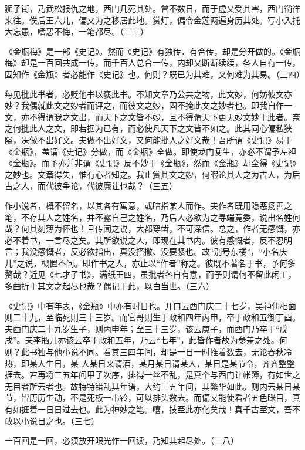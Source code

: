 {狮子街，乃武松报仇之地，西门几死其处。曾不数日，而于虚又受其害，西门徜徉来往。俟后王六儿，偏又为之移居此地。赏灯，偏令金莲两遍身历其处。写小入托大忘患，嗜恶不悔，一笔都尽。（三三）

《金瓶梅》是一部《史记》。然而《史记》有独传．有合传，却是分开做的。《金瓶梅》却是一百回共成一传，而千百人总合一传，内却又断断续续，各人自有一传，固知作《金瓶》者必能作《史记》也。何则？既已为其难，又何难为其易。（三四）

每见批此书者，必贬他书以褒此书。不知文章乃公共之物，此文妙，何妨彼文亦妙？我偶就此文之妙者而评之，而彼文之妙，固不掩此文之妙者也。即我自作一文，亦不得谓我之文出，而天下之文皆不妙，且不得谓天下更无妙文妙于此者。奈之何批此人之文，即若据为已有，而必使凡天下之文皆不如之。此其同心偏私狭隘，决做不出好文。夫做不出好文，又何能批人之好文哉！吾所谓《史记》易于《金瓶》，盖谓《史记》分做，而《金瓶》全做。即使龙门复生，亦必不谓予左袒《金瓶》。而予亦并非谓《史记》反不妙于《金瓶》，然而《金瓶》却全得《史记》之妙也。文章得失，惟有心者知之。我止赏其文之妙，何暇论其人之为古人，为后古之人，而代彼争论，代彼廉让也哉？（三五）

作小说者，概不留名，以其各有寓意，或暗指某人而作。夫作者既用隐恶扬善之笔，不存其人之姓名，并不露自己之姓名，乃后人必欲为之寻端竟委，说出名姓何哉？何其刻薄为怀也！且传闻之说，大都穿凿，不可深信。总之，作者无感慨，亦必不着书，一言尽之矣。其所欲说之人，即现在其书内。彼有感慨者，反不忍明言；我没感慨者，反必欲指出，真没搭撒、没要紧也。故“别号东楼”，“小名庆儿”之说，概置不问。即作书之人，亦止以“作者”称之。彼既不著名于书，予何多赘哉？近见《七才子书》，满纸王四，虽批者各自有意，而予则谓何不留此闲工，多曲折于其文之起尽也哉？偶记于此，以白当世。（三六）

《史记》中有年表，《金瓶》中亦有时日也。开口云西门庆二十七岁，吴神仙相面则二十九，至临死则三十三岁。而官哥则生于政和四年丙申，卒于政和五御丁酉。夫西门庆二十九岁生子，则丙申年；至三十三岁，该云庚子，而西门乃卒于“戊戌”。夫李瓶儿亦该云卒于政和五年，乃云“七年”，此皆作者故为参差之处。何则？此书独与他小说不同。看其三四年间，却是一日一时推着数去，无论春秋冷热，即某人生日，某
人某日来请酒，某月某日请某人，某日是某节令，齐齐整整捱去。若再将三五年间甲子次序，排得一丝不乱，是真个与西门计帐簿，有如世之无目者所云者也。故特特错乱其年谱，大约三五年间，其繁华如此。则内云某日某节，皆历历生动，不是死板一串铃，可以排头数去。而偏又能使看者五色眯目，真有如捱着一日日过去也。此为神妙之笔。嘻，技至此亦化矣哉！真千古至文，吾不敢以小说目之也。（三七）

一百回是一回，必须放开眼光作一回读，乃知其起尽处。（三八）

}
